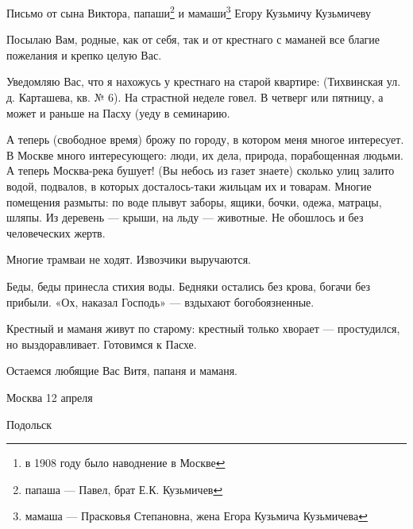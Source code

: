 \date{1908-04-12\footnote{в 1908 году было наводнение в Москве}}

Письмо от сына Виктора, папаши\footnote{папаша — Павел, брат Е.К. Кузьмичев} и мамаши\footnote{мамаша — Прасковья Степановна, жена Егора Кузьмича Кузьмичева} Егору Кузьмичу Кузьмичеву



Посылаю Вам, родные, как от себя, так и от крестнаго с маманей все благие пожелания и крепко целую Вас.

Уведомляю Вас, что я нахожусь у крестнаго на старой квартире: (Тихвинская ул. д. Карташева, кв. № 6). На страстной неделе говел. В четверг или пятницу, а может и раньше на  Пасху (уеду в семинарию. 

А теперь (свободное время) брожу по городу, в котором меня многое интересует. В Москве много интересующего: люди, их дела, природа, порабощенная людьми. А теперь Москва-река бушует! (Вы небось из газет знаете) сколько улиц залито водой, подвалов, в которых  досталось-таки жильцам их и товарам. Многие помещения размыты: по воде плывут заборы, ящики, бочки, одежа, матрацы, шляпы. Из деревень — крыши, на льду — животные. Не обошлось и без человеческих жертв. 

Многие трамваи не ходят. Извозчики выручаются. 

Беды, беды принесла стихия воды. Бедняки остались без крова, богачи без прибыли. 
«Ох, наказал Господь» — вздыхают богобоязненные.

Крестный и маманя живут по старому: крестный только хворает — простудился, но выздоравливает. Готовимся к Пасхе. 

Остаемся любящие Вас Витя, папаня и маманя.

Москва 12 апреля 


\date{1909-02-20}


Подольск%



